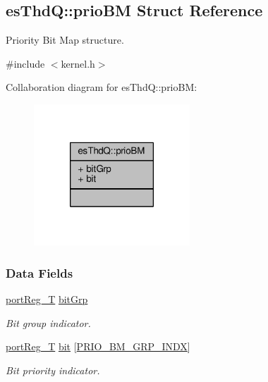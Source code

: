 \hypertarget{structesThdQ_1_1prioBM}{\subsection{es\-Thd\-Q\-:\-:prio\-B\-M Struct Reference}
\label{structesThdQ_1_1prioBM}
}


Priority Bit Map structure.  




{\ttfamily \#include $<$kernel.\-h$>$}



Collaboration diagram for es\-Thd\-Q\-:\-:prio\-B\-M\-:\nopagebreak
\begin{figure}[H]
\begin{center}
\leavevmode
\includegraphics[width=166pt]{structesThdQ_1_1prioBM__coll__graph}
\end{center}
\end{figure}
\subsubsection*{Data Fields}
\begin{DoxyCompactItemize}
\item 
\hyperlink{group__template__cpu__intf_ga99980ab56ce9857e7380210d12e3d41f}{port\-Reg\-\_\-\-T} \hyperlink{structesThdQ_1_1prioBM_a8beff1a57efbada9bf00892b901e5dfb}{bit\-Grp}
\begin{DoxyCompactList}\small\item\em Bit group indicator. \end{DoxyCompactList}\item 
\hyperlink{group__template__cpu__intf_ga99980ab56ce9857e7380210d12e3d41f}{port\-Reg\-\_\-\-T} \hyperlink{structesThdQ_1_1prioBM_a62b0a673887a92104df88f7797c2d2fa}{bit} \mbox{[}\hyperlink{group__kern__intf_ga28fb55234bec595dbeb2c264ac084cc1}{P\-R\-I\-O\-\_\-\-B\-M\-\_\-\-G\-R\-P\-\_\-\-I\-N\-D\-X}\mbox{]}
\begin{DoxyCompactList}\small\item\em Bit priority indicator. \end{DoxyCompactList}\end{DoxyCompactItemize}


